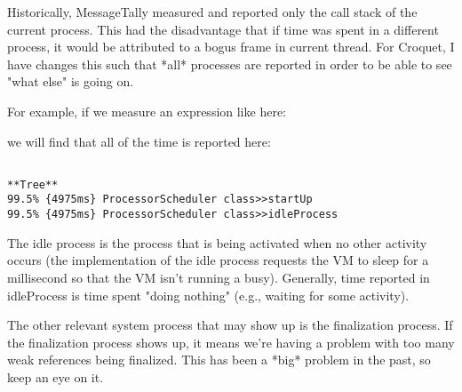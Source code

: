 \documentclass[a4paper,10pt,twoside]{book}
\begin{document}
Historically, MessageTally measured and reported only the call stack of
the current process. This had the disadvantage that if time was spent in
a different process, it would be attributed to a bogus frame in current
thread. For Croquet, I have changes this such that *all* processes are
reported in order to be able to see "what else" is going on.

For example, if we measure an expression like here:


we will find that all of the time is reported here:

\begin{verbatim}

**Tree**
99.5% {4975ms} ProcessorScheduler class>>startUp
99.5% {4975ms} ProcessorScheduler class>>idleProcess
\end{verbatim}

The idle process is the process that is being activated when no other
activity occurs (the implementation of the idle process requests the VM
to sleep for a millisecond so that the VM isn't running a busy).
Generally, time reported in idleProcess is time spent "doing nothing"
(e.g., waiting for some activity).

The other relevant system process that may show up is the finalization
process. If the finalization process shows up, it means we're having a
problem with too many weak references being finalized. This has been a
*big* problem in the past, so keep an eye on it.

\ifx\wholebook\relax\else
\end{document}
